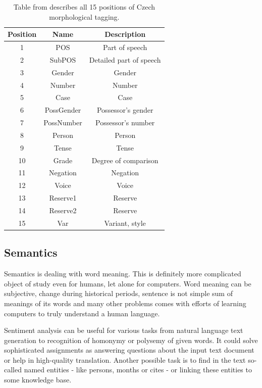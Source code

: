 \begin{table}
\centering
\label{Tab:tagset}
\begin{tabular}{ |c|c|c| } 


 \hline
 Position & Name & Description \\ 
 \hline \hline
 1 & POS & Part of speech \\ \hline
 2 & SubPOS & Detailed part of speech \\ \hline
  3 & Gender & Gender \\ \hline
4 & Number & Number \\\hline
  5 & Case & Case \\ \hline
 6 & PossGender & Possessor's gender \\\hline
  7 & PossNumber & Possessor's number \\ \hline
8 & Person & Person \\\hline
  9 & Tense & Tense \\ \hline
 10 & Grade & Degree of comparison\\\hline
  11 & Negation & Negation \\ \hline
 12 & Voice & Voice \\\hline
 13 & Reserve1 & Reserve \\ \hline
14 & Reserve2 & Reserve \\\hline
  15 & Var & Variant, style \\ 
 \hline

\end{tabular}
\caption{Table from \citep{Hana2005} describes all 15 positions of Czech morphological tagging.
} 
\end{table}


\subsection{Semantics}
Semantics is dealing with word meaning. This is definitely more complicated object of study even for humans, let alone for computers. Word meaning can be subjective, change during historical periods, sentence is not simple sum of meanings of its words and many other problems comes with efforts of learning computers to truly understand a human language.

Sentiment analysis can be useful for various tasks from natural language text generation to recognition of homonymy or polysemy of given words. It could solve sophisticated assignments as answering questions about the input text document or help in high-quality translation. Another possible task is to find in the text so-called named entities - like persons, months or cites - or linking these entities to some knowledge base. 
